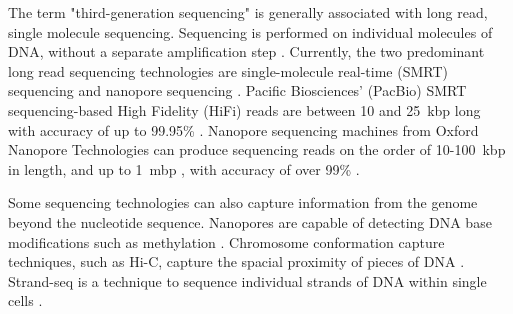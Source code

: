 \documentclass[11pt]{ucscthesis}
\begin{document}
The term "third-generation sequencing" is generally associated with long read, single molecule sequencing.
Sequencing is performed on individual molecules of DNA, without a separate amplification step \cite{sequencing_review_2016}.
Currently, the two predominant long read sequencing technologies are single-molecule real-time (SMRT) sequencing and nanopore sequencing \cite{lr_review_2023}.
Pacific Biosciences' (PacBio) SMRT sequencing-based High Fidelity (HiFi) reads are between 10 and 25~kbp long with accuracy of up to 99.95\% \cite{pacbio_2019,lr_review_2023}.
Nanopore sequencing machines from Oxford Nanopore Technologies can produce sequencing reads on the order of 10-100~kbp in length, and up to 1~mbp \cite{nanopore_ultralong_2018}, with accuracy of over 99\% \cite{nanopore-fly-accuracy_2024, damaraju_long-read_2024}.

Some sequencing technologies can also capture information from the genome beyond the nucleotide sequence.
Nanopores are capable of detecting DNA base modifications such as methylation \cite{wang_nanopore_2021}. 
Chromosome conformation capture techniques, such as Hi-C, capture the spacial proximity of pieces of DNA \cite{lieberman_hic_2009}. 
Strand-seq is a technique to sequence individual strands of DNA within single cells \cite{sanders_strandseq_2017}.



\end{document}
